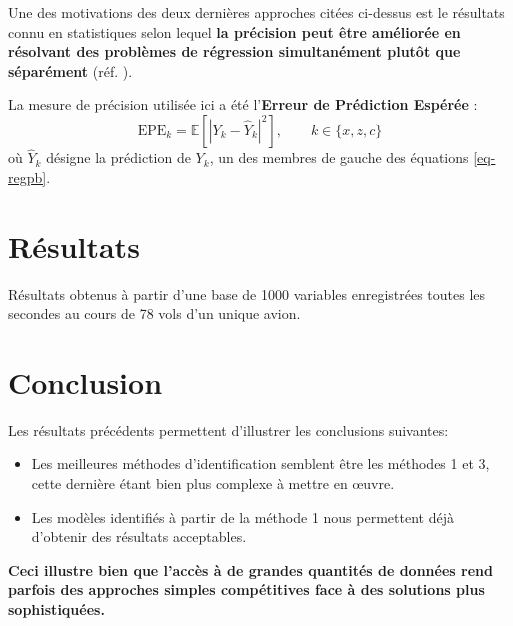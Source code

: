 \documentclass[a0,portrait]{a0poster}
\newcommand{\E}[1]{\mathbb{E}[#1]}
\begin{document}
\begin{multicols}{2}
Une des motivations des deux dernières approches citées ci-dessus est le résultats connu en statistiques selon lequel \textbf{la précision peut être améliorée en résolvant des problèmes de régression simultanément plutôt que séparément} (réf. \cite{stein61}).

La mesure de précision utilisée ici a été l'\textbf{Erreur de Prédiction Espérée} :
\begin{equation}
\mbox{EPE}_k = \E{|Y_k - \hat{Y}_k|^2}, \qquad k\in \{x,z,c\}
\end{equation}
où $\hat{Y}_k$ désigne la prédiction de $Y_k$, un des membres de gauche des équations \eqref{eq-regpb}.

\section{Résultats}

Résultats obtenus à partir d'une base de 1000 variables enregistrées toutes les secondes au cours de 78 vols d'un unique avion.




\section{Conclusion}
\color{Navy} %

Les résultats précédents permettent d'illustrer les conclusions suivantes:
\begin{itemize}
\item Les meilleures méthodes d'identification semblent être les méthodes 1 et 3, cette dernière étant bien plus complexe à mettre en œuvre.
\item Les modèles identifiés à partir de la méthode 1 nous permettent déjà d'obtenir des résultats acceptables.
\end{itemize}
\textbf{Ceci illustre bien que l'accès à de grandes quantités de données rend parfois des approches simples compétitives face à des solutions plus sophistiquées.}
\vspace{1cm}


\end{multicols}
\end{document}
